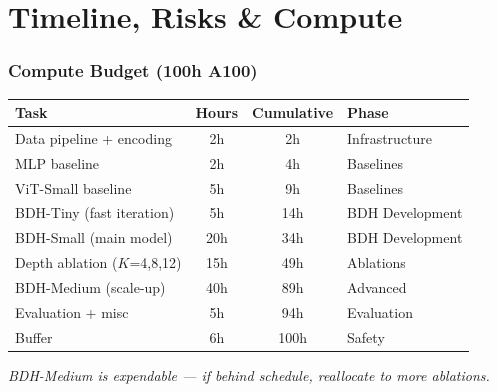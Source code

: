 \documentclass{beamer}
\begin{document}
\section{Timeline, Risks \& Compute}

\begin{frame}
\frametitle{Compute Budget (100h A100)}

\begin{table}
\centering
\footnotesize
\begin{tabular}{lccl}
\toprule
\textbf{Task} & \textbf{Hours} & \textbf{Cumulative} & \textbf{Phase} \\
\midrule
Data pipeline + encoding & 2h & 2h & Infrastructure \\
MLP baseline & 2h & 4h & Baselines \\
ViT-Small baseline & 5h & 9h & Baselines \\
\midrule
BDH-Tiny (fast iteration) & 5h & 14h & BDH Development \\
BDH-Small (main model) & 20h & 34h & BDH Development \\
Depth ablation ($K$=4,8,12) & 15h & 49h & Ablations \\
\midrule
BDH-Medium (scale-up) & 40h & 89h & Advanced \\
Evaluation + misc & 5h & 94h & Evaluation \\
\alert{Buffer} & \alert{6h} & \alert{100h} & Safety \\
\bottomrule
\end{tabular}
\end{table}

\vspace{0.3em}
\begin{center}
\footnotesize
\textit{BDH-Medium is expendable --- if behind schedule, reallocate to more ablations.}
\end{center}

\end{frame}
\end{document}
